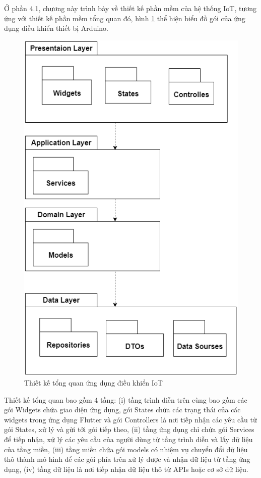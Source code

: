 \documentclass[../DoAn.tex]{subfiles}
\begin{document}
Ở phần 4.1, chương này trình bày về thiết kế phần mềm của hệ thống IoT, tương ứng với thiết kế phần mềm tổng quan đó, hình \ref{fig:Fig2} thể hiện biểu đồ gói của ứng dụng điều khiển thiết bị Arduino.

\begin{figure}[H]
    \centering
    \includegraphics[scale = 0.6]{Hinhve/UML_tong_quan.png}
    \caption{Thiết kế tổng quan ứng dụng điều khiển IoT}
    \label{fig:Fig2}
\end{figure}

Thiết kế tổng quan bao gồm 4 tầng: (i) tầng trình diễn trên cùng bao gồm các gói Widgets chứa giao diện ứng dụng, gói States chứa các trạng thái của các widgets trong ứng dụng Flutter và gói Controllers là nơi tiếp nhận các yêu cầu từ gói States, xử lý và gửi tới gói tiếp theo, (ii) tầng ứng dụng chỉ chứa gói Services để tiếp nhận, xử lý các yêu cầu của người dùng từ tầng trình diễn và lấy dữ liệu của tầng miền, (iii) tầng miền chứa gói models có nhiệm vụ chuyển đổi dữ liệu thô thành mô hình để các gói phía trên xử lý được và nhận dữ liệu từ tầng ứng dụng, (iv) tầng dữ liệu là nơi tiếp nhận dữ liệu thô từ APIs hoặc cơ sở dữ liệu.
\end{document}

